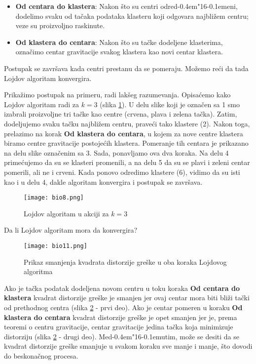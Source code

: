 \documentclass[a4paper]{book}
\def \dj {d\kern-0.4em\char"16\kern-0.1em}
\begin{document}
\begin{itemize}
\item \textbf{Od centara do klastera}: Nakon što su centri odre\dj eni, dodelimo svaku od tačaka podataka klasteru koji odgovara najbližem centru; veze su proizvoljno raskinute.

\item \textbf{Od klastera do centara}: Nakon što su tačke dodeljene klasterima, označimo centar gravitacije svakog klastera kao novi centar klastera.
\end{itemize}
 
Postupak se završava kada centri prestanu da se pomeraju. Možemo reći da tada Lojdov algoritam konvergira.
 
Prikažimo postupak na primeru, radi lakšeg razumevanja. Opisaćemo kako Lojdov algoritam radi za $k=3$ (slika \ref{slika 10}). 
U delu slike koji je označen sa 1 smo izabrali proizvoljne tri tačke kao centre (crvena, plava i zelena tačka). Zatim, dodeljujemo svaku tačku najbližem centru, praveći tako klastere (2). Nakon toga, prelazimo na korak \textbf{Od klastera do centara}, u kojem za nove centre klastera biramo centre gravitacije postojećih klastera. Pomeranje tih centara je prikazano na delu slike označenim sa 3. Sada, ponavljamo ova dva koraka. Na delu 4 primećujemo da su se klasteri promenili, a na delu 5 da su se plavi i zeleni centar pomerili, ali ne i crveni. Kada ponovo odredimo klastere (6), vidimo da su isti kao i u delu 4, dakle algoritam konvergira i postupak se završava.
\begin{figure}[h!]
    \centering
    \texttt{[image: bio8.png]}
    \caption{Lojdov algoritam u akciji za $k=3$}
    \label{slika 10}
\end{figure}

Da li Lojdov algoritam mora da konvergira?
\begin{figure}[h!]
    \centering
    \texttt{[image: bio11.png]}
    \caption{Prikaz smanjenja kvadrata distorzije greške u oba koraka Lojdovog algoritma}
    \label{slika 11}
\end{figure}


Ako je tačka podatak dodeljena novom centru u toku koraka \textbf{Od centara do klastera} kvadrat distorzije greške je smanjen jer ovaj centar mora biti bliži tački od prethodnog centra (slika \ref{slika 11} - prvi deo). Ako je centar pomeren u koraku \textbf{Od klastera do centara} kvadrat distorzije greške je opet smanjen jer je, prema teoremi o centru gravitacije, centar gravitacije jedina tačka koja minimizuje distorziju (slika \ref{slika 11} - drugi deo). Me\dj utim, može se desiti da se kvadrat distorzije greške smanjuje u svakom koraku sve manje i manje, što dovodi do beskonačnog procesa.
\end{document}
